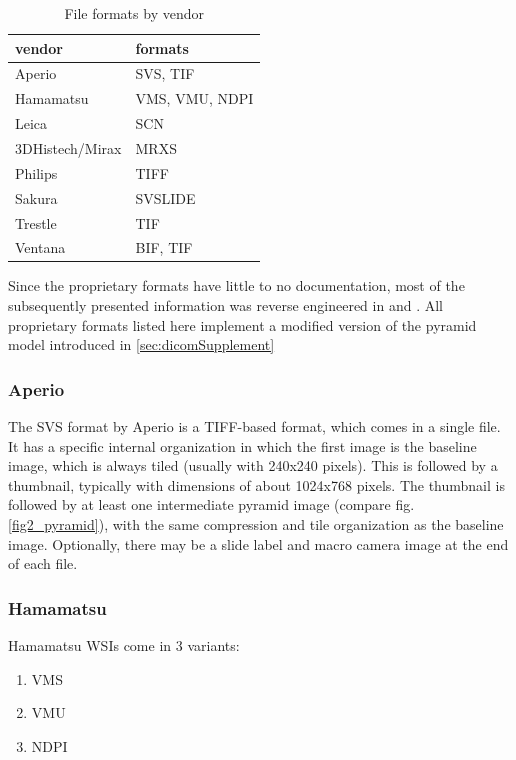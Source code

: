 \begin{table}[H]
	\begin{center}
		\begin{tabular}{| l | l |}
			\hline
			\textbf{vendor} & \textbf{formats}\\ \hline
			Aperio & SVS, TIF\\ \hline
			Hamamatsu & VMS, VMU, NDPI\\ \hline
			Leica & SCN\\ \hline
			3DHistech/Mirax & MRXS\\ \hline
			Philips & TIFF\\ \hline
			Sakura & SVSLIDE\\ \hline
			Trestle & TIF\\ \hline
			Ventana & BIF, TIF\\ \hline
		\end{tabular}
		\caption{File formats by vendor}
		\label{tab2_formatsByVendor}
	\end{center}
\end{table}

Since the proprietary formats have little to no documentation, most of the subsequently presented information was reverse engineered in \cite{Goode13} and \cite{web:openslide}. All proprietary formats listed here implement a modified version of the pyramid model introduced in \ref{sec:dicomSupplement}


\subsubsection{Aperio}
The SVS format by Aperio is a TIFF-based format, which comes in a single file\cite{Goode13}. It has a specific internal organization in which the first image is the baseline image, which is always tiled (usually with 240x240 pixels). This is followed by a thumbnail, typically with dimensions of about 1024x768 pixels. The thumbnail is followed by at least one intermediate pyramid image (compare fig. \ref{fig2_pyramid}), with the same compression and tile organization as the baseline image\cite{web:openslide}. Optionally, there may be a slide label and macro camera image at the end of each file\cite{web:openslide}.


\subsubsection{Hamamatsu}
Hamamatsu WSIs come in 3 variants:
\begin{enumerate}[(1)]
	\item VMS
	\item VMU
	\item NDPI
\end{enumerate}

